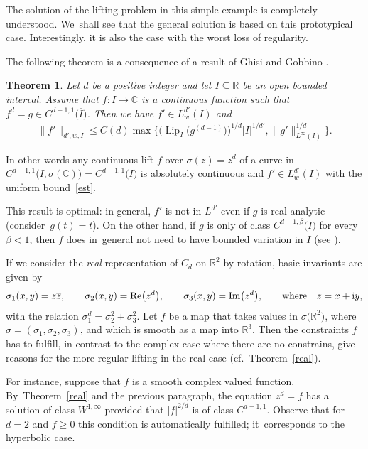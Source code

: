 \documentclass[pdftex]{sigma}
\numberwithin{equation}{section}
\newtheorem{Theorem}{Theorem}[section]
\def\be{\beta}
\def\si{\sigma}
\def\C{\mathbb{C}}
\def\R{\mathbb{R}}
\def\oI{\overline I}
\def\ol{\overline}
\def\Lip{\on{Lip}}
\renewcommand{\Re}{\mathrm{Re}}
\renewcommand{\Im}{\mathrm{Im}}
\let\on=\operatorname
\begin{document}
The solution of the lifting problem in this simple example is completely understood. We~shall see that the general
solution is based on this prototypical case. Interestingly, it is also the case with the worst loss of regularity.

The following theorem is a consequence of a result of Ghisi and Gobbino \cite{GhisiGobbino13}.

\begin{Theorem} \label{cor:radicals}
 Let $d$ be a positive integer and
 let $I \subseteq \R$ be an open bounded interval. Assume that $f \colon I \to \C$ is a continuous function such that
 $f^d = g \in C^{d-1,1}\big(\oI\big)$.
 Then we have $f' \in L^{d'}_w(I)$ and
 \begin{gather} \label{est}
 \|f'\|_{d',w,I} \le
 C(d) \max\Big\{\big(\Lip_{I}\big(g^{(d-1)}\big)\big)^{1/d}|I|^{1/d'},
 \|g'\|_{L^\infty(I)}^{1/d}\Big\}.
 \end{gather}
\end{Theorem}

In other words
any continuous lift $f$ over $\si(z) = z^d$ of a curve in $C^{d-1,1}\big(\ol I,\si(\C)\big) = C^{d-1,1}\big(\ol I\big)$
is absolutely continuous and $f' \in L^{d'}_w(I)$ with the uniform bound~\eqref{est}.

\begin{Remark} \label{optimality}
This result is optimal: in general, $f'$ is not in $L^{d'}$ even if $g$ is real analytic (consider~$g(t) = t$).
On the other hand, if $g$ is only of class $C^{d-1,\be}\big(\overline I\big)$ for every $\be<1$, then $f$
does in~general not need to have bounded variation
in $I$ (see \cite[Example 4.4]{GhisiGobbino13}).
\end{Remark}

\begin{Remark}
 If we consider the \emph{real} representation of $C_d$ on $\R^2$ by rotation, basic invariants are given by
 \begin{gather*}
 \si_1(x,y)= z \ol z, \qquad
 \si_2(x,y)= \Re\big(z^d\big), \qquad
 \si_3(x,y) = \Im\big(z^d\big),\qquad \text{where}\quad
 z = x + {\rm i} y,
 \end{gather*}
 with the relation $\si_1^d = \si_2^2 + \si_3^2$.
 Let $f$ be a map that takes values in $\si\big(\R^2\big)$, where $\si=(\si_1,\si_2,\si_3)$, and which is smooth as a map
 into $\R^3$. Then the constraints $f$ has to fulfill, in contrast to the complex case where there are no constrains,
 give reasons for the more regular lifting in the real case (cf.\ Theorem~\ref{real}).

 For instance, suppose that $f$ is a smooth complex valued function. By~Theorem~\ref{real} and the previous paragraph,
 the equation $z^d = f$ has a solution of class $W^{1,\infty}$ provided that $|f|^{2/d}$ is of class $C^{d-1,1}$.
 Observe that for $d=2$ and $f\ge 0$ this condition is automatically fulfilled; it~corresponds to the hyperbolic case.
\end{Remark}
\end{document}
